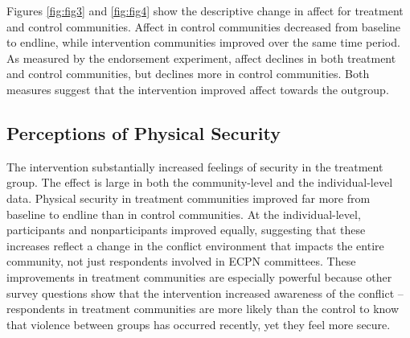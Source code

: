 \documentclass[11pt]{article}
\begin{document}
Figures \ref{fig:fig3} and \ref{fig:fig4} show the descriptive change in
affect for treatment and control communities. Affect in control
communities decreased from baseline to endline, while intervention
communities improved over the same time period. As measured by the
endorsement experiment, affect declines in both treatment and control
communities, but declines more in control communities. Both measures
suggest that the intervention improved affect towards the outgroup.

\hypertarget{perceptions-of-physical-security}{%
\subsection{Perceptions of Physical
Security}\label{perceptions-of-physical-security}}

The intervention substantially increased feelings of security in the
treatment group. The effect is large in both the community-level and the
individual-level data. Physical security in treatment communities
improved far more from baseline to endline than in control communities.
At the individual-level, participants and nonparticipants improved
equally, suggesting that these increases reflect a change in the
conflict environment that impacts the entire community, not just
respondents involved in ECPN committees. These improvements in treatment
communities are especially powerful because other survey questions show
that the intervention increased awareness of the conflict -- respondents
in treatment communities are more likely than the control to know that
violence between groups has occurred recently, yet they feel more
secure.
\end{document}
